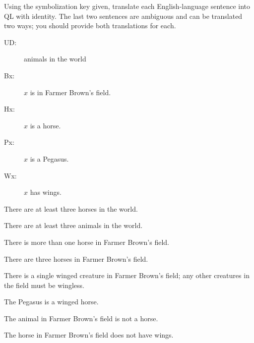 \problempart Using the symbolization key given, translate each English-language sentence into QL with identity. The last two sentences are ambiguous and can be translated two ways; you should provide both translations for each.
\begin{description}
\item[UD:] animals in the world
\item[Bx:] $x$ is in Farmer Brown's field.
\item[Hx:] $x$ is a horse.
\item[Px:] $x$ is a Pegasus.
\item[Wx:] $x$ has wings.
\end{description}
\begin{kormanize}
\item There are at least three horses in the world.
\item There are at least three animals in the world.
\item There is more than one horse in Farmer Brown's field.
\item There are three horses in Farmer Brown's field.
\item There is a single winged creature in Farmer Brown's field; any other creatures in the field must be wingless.
\item The Pegasus is a winged horse.
\item The animal in Farmer Brown's field is not a horse.
\item The horse in Farmer Brown's field does not have wings.
\end{kormanize}





